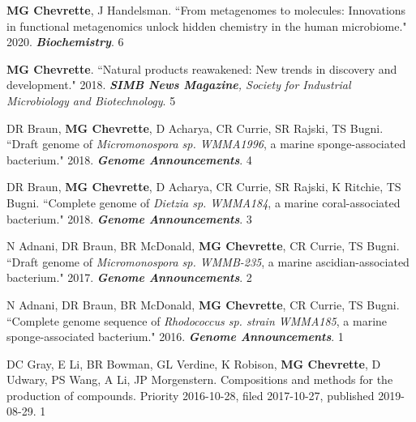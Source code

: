 \begin{cvpubs}

\cvpub
{\textbf{MG Chevrette}, J Handelsman. ``From metagenomes to molecules: Innovations in functional metagenomics unlock hidden chemistry in the human microbiome." 2020. \textit{\textbf{Biochemistry}}. \textbf{\textit{}}}
{6}

\cvpub
{\textbf{MG Chevrette}. ``Natural products reawakened: New trends in discovery and development." 2018. \textit{\textbf{SIMB News Magazine}, Society for Industrial Microbiology and Biotechnology}. }
{5}

\cvpub
{DR Braun, \textbf{MG Chevrette}, D Acharya, CR Currie, SR Rajski, TS Bugni. ``Draft genome of \textit{Micromonospora sp. WMMA1996}, a marine sponge-associated bacterium." 2018. \textit{\textbf{Genome Announcements}}. \textbf{\textit{}}}
{4}

\cvpub
{DR Braun, \textbf{MG Chevrette}, D Acharya, CR Currie, SR Rajski, K Ritchie, TS Bugni. ``Complete genome of \textit{Dietzia sp. WMMA184}, a marine coral-associated bacterium." 2018. \textit{\textbf{Genome Announcements}}. \textbf{\textit{}}}
{3}

\cvpub
{N Adnani, DR Braun, BR McDonald, \textbf{MG Chevrette}, CR Currie, TS Bugni. ``Draft genome of \textit{Micromonospora sp. WMMB-235}, a marine ascidian-associated bacterium." 2017. \textit{\textbf{Genome Announcements}}. \textbf{\textit{}}}
{2}

\cvpub
{N Adnani, DR Braun, BR McDonald, \textbf{MG Chevrette}, CR Currie, TS Bugni. ``Complete genome sequence of \textit{Rhodococcus sp. strain WMMA185}, a marine sponge-associated bacterium." 2016. \textit{\textbf{Genome Announcements}}. \textbf{\textit{}}}
{1}

\end{cvpubs}


\begin{cvpubs}

\cvpub
{DC Gray, E Li, BR Bowman, GL Verdine, K Robison, \textbf{MG Chevrette}, D Udwary, PS Wang, A Li, JP Morgenstern. Compositions and methods for the production of compounds. Priority 2016-10-28, filed 2017-10-27, published 2019-08-29. \textbf{\textit{}}}
{1}

\end{cvpubs}

